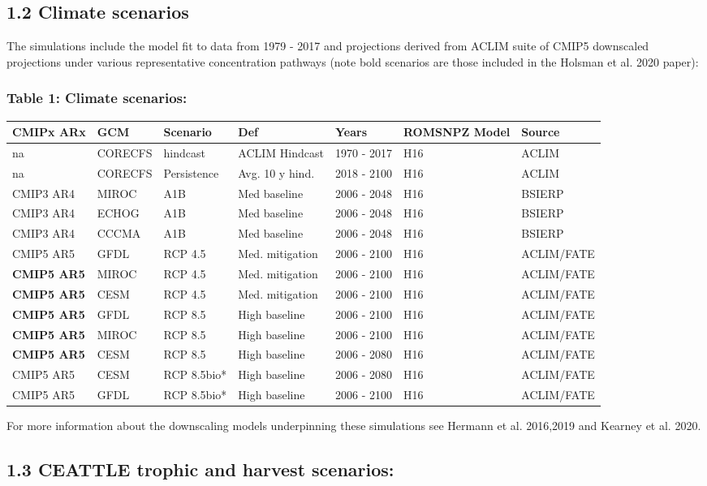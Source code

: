 \documentclass[]{article}
\begin{document}
\subsection{1.2 Climate scenarios}\label{climate-scenarios}

The simulations include the model fit to data from 1979 - 2017 and
projections derived from ACLIM suite of CMIP5 downscaled projections
under various representative concentration pathways (note bold scenarios
are those included in the Holsman et al. 2020 paper):

\subsubsection{Table 1: Climate
scenarios:}\label{table-1-climate-scenarios}

\begin{longtable}[]{@{}lllllll@{}}
\toprule
CMIPx ARx & GCM & Scenario & Def & Years & ROMSNPZ Model &
Source\tabularnewline
\midrule
\endhead
na & CORECFS & hindcast & ACLIM Hindcast & 1970 - 2017 & H16 &
ACLIM\tabularnewline
na & CORECFS & Persistence & Avg. 10 y hind. & 2018 - 2100 & H16 &
ACLIM\tabularnewline
CMIP3 AR4 & MIROC & A1B & Med baseline & 2006 - 2048 & H16 &
BSIERP\tabularnewline
CMIP3 AR4 & ECHOG & A1B & Med baseline & 2006 - 2048 & H16 &
BSIERP\tabularnewline
CMIP3 AR4 & CCCMA & A1B & Med baseline & 2006 - 2048 & H16 &
BSIERP\tabularnewline
CMIP5 AR5 & GFDL & RCP 4.5 & Med. mitigation & 2006 - 2100 & H16 &
ACLIM/FATE\tabularnewline
\textbf{CMIP5 AR5} & MIROC & RCP 4.5 & Med. mitigation & 2006 - 2100 &
H16 & ACLIM/FATE\tabularnewline
\textbf{CMIP5 AR5} & CESM & RCP 4.5 & Med. mitigation & 2006 - 2100 &
H16 & ACLIM/FATE\tabularnewline
\textbf{CMIP5 AR5} & GFDL & RCP 8.5 & High baseline & 2006 - 2100 & H16
& ACLIM/FATE\tabularnewline
\textbf{CMIP5 AR5} & MIROC & RCP 8.5 & High baseline & 2006 - 2100 & H16
& ACLIM/FATE\tabularnewline
\textbf{CMIP5 AR5} & CESM & RCP 8.5 & High baseline & 2006 - 2080 & H16
& ACLIM/FATE\tabularnewline
CMIP5 AR5 & CESM & RCP 8.5bio* & High baseline & 2006 - 2080 & H16 &
ACLIM/FATE\tabularnewline
CMIP5 AR5 & GFDL & RCP 8.5bio* & High baseline & 2006 - 2100 & H16 &
ACLIM/FATE\tabularnewline
\bottomrule
\end{longtable}

For more information about the downscaling models underpinning these
simulations see Hermann et al. 2016,2019 and Kearney et al. 2020.

\subsection{1.3 CEATTLE trophic and harvest
scenarios:}\label{ceattle-trophic-and-harvest-scenarios}
\end{document}
